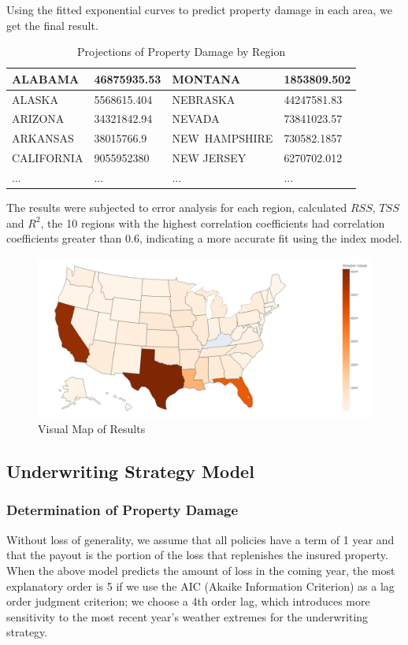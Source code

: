 \documentclass[12pt]{article}  %
\begin{document}
Using the fitted exponential curves to predict property damage in each area, we get the final result.

\begin{table}[!ht]
    \centering
    \begin{tabular}{|l|l|l|l|}
    \hline
        ALABAMA & 46875935.53 & MONTANA & 1853809.502 \\ \hline
        ALASKA & 5568615.404 & NEBRASKA & 44247581.83 \\ \hline
        ARIZONA & 34321842.94 & NEVADA & 73841023.57 \\ \hline
        ARKANSAS & 38015766.9 & NEW HAMPSHIRE & 730582.1857 \\ \hline
        CALIFORNIA & 9055952380 & NEW JERSEY & 6270702.012 \\ \hline
        ... & ... & ... & ... \\ \hline
    \end{tabular}
    \caption{\label{demo-table}Projections of Property Damage by Region}
\end{table}

The results were subjected to error analysis for each region, calculated $RSS$, $TSS$ and $R^2$, the 10 regions with the highest correlation coefficients had correlation coefficients greater than 0.6, indicating a more accurate fit using the index model.

\begin{figure}[htbp]
\centering
\includegraphics[width=.62\textwidth]{img/img04.png}
\caption{Visual Map of Results}
\end{figure}

\clearpage

\subsection{Underwriting Strategy Model}
\subsubsection{Determination of Property Damage}
Without loss of generality, we assume that all policies have a term of 1 year and that the payout is the portion of the loss that replenishes the insured property. When the above model predicts the amount of loss in the coming year, the most explanatory order is 5 if we use the AIC (Akaike Information Criterion) as a lag order judgment criterion; we choose a 4th order lag, which introduces more sensitivity to the most recent year's weather extremes for the underwriting strategy.
\end{document}
